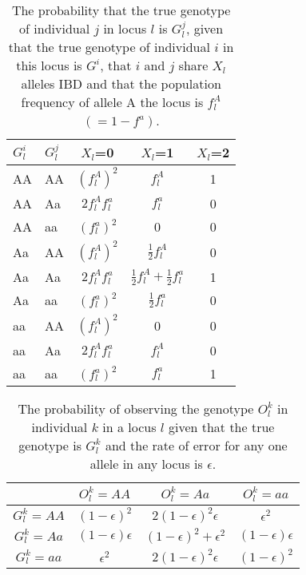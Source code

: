\documentclass[a4paper, 11pt]{article}
\begin{document}
\begin{table}[h!]
  \centering
  \begin{tabular}{|l|l|c|c|c|}
\hline
$G^{i}_l$ & $G^{j}_l$    & $X_l$=0 & $X_l$=1 & $X_l$=2\\
\hline
AA & AA & $(f^A_l)^2$ & $f^A_l$ & 1\\
AA & Aa & $2f^A_lf^a_l$ & $f^a_l$ & 0\\
AA & aa & $(f^a_l)^2$ & 0 & 0\\
Aa & AA & $(f^A_l)^2$ & $\frac{1}{2}f^A_l$ & 0\\
Aa & Aa & $2f^A_lf^a_l$ & $\frac{1}{2}f^A_l + \frac{1}{2}f^a_l$ & 1\\
Aa & aa & $(f^a_l)^2$ & $\frac{1}{2}f^a_l$ & 0\\
aa & AA & $(f^A_l)^2$ & 0 & 0\\
aa & Aa & $2f^A_lf^a_l$ & $f^A_l$ & 0\\
aa & aa & $(f^a_l)^2$ & $f^a_l$ & 1\\
\hline
  \end{tabular}
  \caption{The probability that the true genotype of individual $j$ in locus $l$ is $G^{j}_l$, given that the true genotype of individual $i$ in this locus is $G^{i}$, that $i$ and $j$ share $X_l$ alleles IBD and that the population frequency of allele A the locus is $f^A_l$ $(=1-f^a)$.}
\label{tab:cond_prob}
\end{table}

\begin{table}[h!]
  \centering
  \begin{tabular}{|c|c|c|c|}
\hline
                         &$ O^k_l=AA$ & $ O^k_l=Aa$ & $ O^k_l=aa$\\
\hline
 $G^k_l=AA$ & $(1-\epsilon)^2$ &$2(1-\epsilon)^2\epsilon$ &$\epsilon^2$\\
\hline
 $G^k_l=Aa$ & $(1-\epsilon)\epsilon$ &$(1-\epsilon)^2+\epsilon^2$ &$(1-\epsilon)\epsilon$\\
\hline
 $G^k_l=aa$ & $\epsilon^2$ &$2(1-\epsilon)^2\epsilon$ &$(1-\epsilon)^2$\\
\hline
\end{tabular}
  \caption{The probability of observing the genotype $O^{k}_l$ in individual $k$ in a locus $l$ given that the true genotype is $G^k_l$ and the rate of error for any one allele in any locus is $\epsilon$.}
\label{tab:epsilon}
\end{table}
\end{document}
